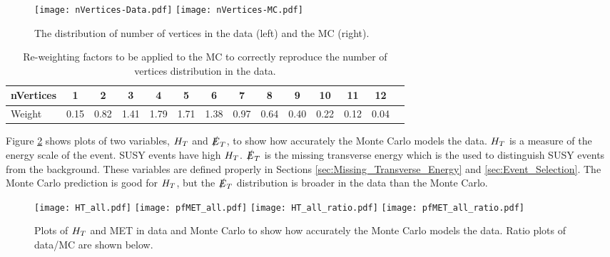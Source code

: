 \begin{figure}
\texttt{[image: nVertices-Data.pdf]}
\texttt{[image: nVertices-MC.pdf]}
\caption{The distribution of number of vertices in the data (left) and the MC
(right).}
\label{fig:nVertices}
\end{figure}


\begin{table}
\begin{center}
{\scriptsize
\begin{tabular}{|l|c|c|c|c|c|c|c|c|c|c|c|c|c|}
\hline
nVertices & 1 & 2 & 3 & 4 & 5 & 6 & 7 & 8 & 9 & 10 & 11 & 12 \\
\hline
Weight & 0.15 & 0.82 & 1.41 & 1.79 & 1.71 & 1.38 & 0.97 & 0.64 & 0.40 & 0.22 &
0.12 & 0.04 \\
\hline
\end{tabular}}
\end{center}
\caption{Re-weighting factors to be applied to the MC to correctly reproduce the
number of vertices distribution in the data.}
\label{tab:factors}
\end{table}

Figure \ref{fig:Data_vs_MC} shows plots of two variables, $H_{T}$ and $\slashed{E}_{T}$,  to 
show how accurately the Monte Carlo models the data. $H_{T}$ is a measure of the 
energy scale of the event. SUSY events have high $H_{T}$. $\slashed{E}_{T}$ is the missing
transverse energy which is the used to distinguish SUSY events from the
background. These variables are defined properly in Sections
\ref{sec:Missing_Transverse_Energy} and \ref{sec:Event_Selection}. The Monte 
Carlo prediction is good for $H_{T}$, but the $\slashed{E}_{T}$ distribution is broader in 
the data than the Monte Carlo. \\

\begin{figure}
\texttt{[image: HT\_all.pdf]}
\texttt{[image: pfMET\_all.pdf]}
\texttt{[image: HT\_all\_ratio.pdf]}
\texttt{[image: pfMET\_all\_ratio.pdf]}
\caption{Plots of $H_{T}$ and MET in data and Monte Carlo to show how accurately
the Monte Carlo models the data. Ratio plots of data/MC are shown below.}
\label{fig:Data_vs_MC}
\end{figure}

